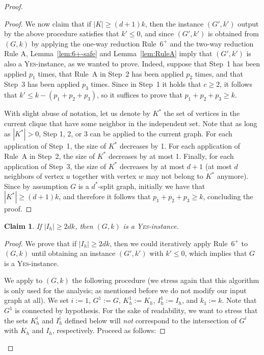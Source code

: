 \documentclass[
final
]{dmtcs-episciences}
\newtheorem{claimN}{Claim}{\bfseries}{\itshape}
\begin{document}
\begin{proof}
\begin{proof}
\noindent We now claim that if $|K| \geq (d+1)k$, then the instance $(G',k')$ output by the above procedure satisfies that $k' \leq 0$, and since $(G',k')$ is obtained from $(G,k)$ by applying the one-way reduction Rule~$6^+$ and the two-way reduction Rule A, Lemma~\ref{lem:6+-safe} and Lemma~\ref{lem:RuleA} imply that  $(G',k')$ is also a \textsc{Yes}-instance, as we wanted to prove. Indeed, suppose that Step~1 has been applied $p_1$ times, that Rule~A in Step~2 has been applied $p_2$ times, and that Step~3 has been applied $p_3$ times. Since in Step~1 it holds that $c \geq 2$, it follows that $k' \leq k - (p_1 + p_2 + p_3)$, so it suffices to prove that $p_1 + p_2 + p_3 \geq k$.

With slight abuse of notation, let us denote by $K^*$ the set of vertices in the current clique that have some neighbor in the independent set. Note that as long as $|K^*| > 0 $, Step 1, 2, or 3 can be applied to the current graph. For each application of Step~1, the size of $K^*$ decreases by 1. For each application of Rule~A in Step~2, the size of $K^*$ decreases by at most 1. Finally, for each application of Step~3, the size of $K^*$ decreases by at most $d+1$ (at most $d$ neighbors of vertex $u$ together with vertex $w$ may not belong to $K^*$ anymore). Since by assumption $G$ is a $d^*$-split graph, initially we have that $|K^*| \geq (d+1)k$, and therefore it follows that $p_1 + p_2 + p_3 \geq k$, concluding the proof.\end{proof}

\begin{claimN}\label{claim:indep-set}
If $|I_h| \geq 2dk$, then $(G,k)$ is a \textsc{Yes}-instance.
\end{claimN}
\begin{proof}
We prove that if $|I_h| \geq 2dk$, then we could iteratively apply Rule~$6^+$ to $(G,k)$ until obtaining an instance $(G',k')$ with $k' \leq 0$, which implies that $G$ is a  \textsc{Yes}-instance.

We apply to $(G,k)$ the following procedure (we stress again that this algorithm is only used for the analysis; as mentioned before we do not modify our input graph at all). We set $i:=1$, $G^1 := G$, $K_h^1 := K_h$,  $I_h^1 := I_h$, and $k_1  := k$. Note that $G^1$ is connected by hypothesis. For the sake of readability, we want to stress that the sets  $K_h^{i}$ and $I_h^{i}$ defined below will {\sl not} correspond to the intersection of $G^i$ with $K_h$ and $I_h$, respectively.  Proceed as follows:


\end{proof}
\end{proof}
\end{document}
